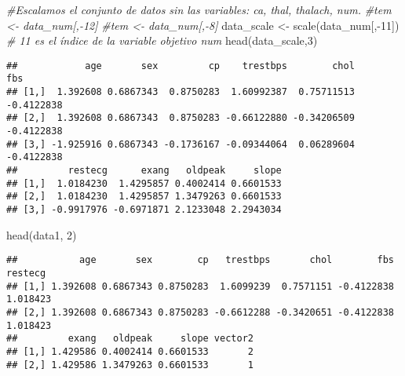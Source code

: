 \documentclass[
]{article}
\newenvironment{Shaded}{\begin{snugshade}}{\end{snugshade}}
\newcommand{\CommentTok}[1]{\textcolor[rgb]{0.56,0.35,0.01}{\textit{#1}}}
\newcommand{\DecValTok}[1]{\textcolor[rgb]{0.00,0.00,0.81}{#1}}
\newcommand{\FunctionTok}[1]{\textcolor[rgb]{0.00,0.00,0.00}{#1}}
\newcommand{\NormalTok}[1]{#1}
\newcommand{\OtherTok}[1]{\textcolor[rgb]{0.56,0.35,0.01}{#1}}
\newcommand{\SpecialCharTok}[1]{\textcolor[rgb]{0.00,0.00,0.00}{#1}}
\begin{document}
\begin{Shaded}
\begin{Highlighting}[]
\CommentTok{\#Escalamos el conjunto de datos sin las variables: ca, thal, thalach, num.}
\CommentTok{\#tem \textless{}{-} data\_num[,{-}12]}
\CommentTok{\#tem \textless{}{-} data\_num[,{-}8]}
\NormalTok{data\_scale }\OtherTok{\textless{}{-}} \FunctionTok{scale}\NormalTok{(data\_num[,}\SpecialCharTok{{-}}\DecValTok{11}\NormalTok{]) }\CommentTok{\# 11 es el índice de la variable objetivo num}
\FunctionTok{head}\NormalTok{(data\_scale,}\DecValTok{3}\NormalTok{)}
\end{Highlighting}
\end{Shaded}

\begin{verbatim}
##            age       sex         cp    trestbps        chol        fbs
## [1,]  1.392608 0.6867343  0.8750283  1.60992387  0.75711513 -0.4122838
## [2,]  1.392608 0.6867343  0.8750283 -0.66122880 -0.34206509 -0.4122838
## [3,] -1.925916 0.6867343 -0.1736167 -0.09344064  0.06289604 -0.4122838
##         restecg      exang   oldpeak     slope
## [1,]  1.0184230  1.4295857 0.4002414 0.6601533
## [2,]  1.0184230  1.4295857 1.3479263 0.6601533
## [3,] -0.9917976 -0.6971871 2.1233048 2.2943034
\end{verbatim}

\begin{Shaded}
\end{Shaded}

\begin{Shaded}
\begin{Highlighting}[]
\FunctionTok{head}\NormalTok{(data1, }\DecValTok{2}\NormalTok{)}
\end{Highlighting}
\end{Shaded}

\begin{verbatim}
##           age       sex        cp   trestbps       chol        fbs  restecg
## [1,] 1.392608 0.6867343 0.8750283  1.6099239  0.7571151 -0.4122838 1.018423
## [2,] 1.392608 0.6867343 0.8750283 -0.6612288 -0.3420651 -0.4122838 1.018423
##         exang   oldpeak     slope vector2
## [1,] 1.429586 0.4002414 0.6601533       2
## [2,] 1.429586 1.3479263 0.6601533       1
\end{verbatim}
\end{document}
